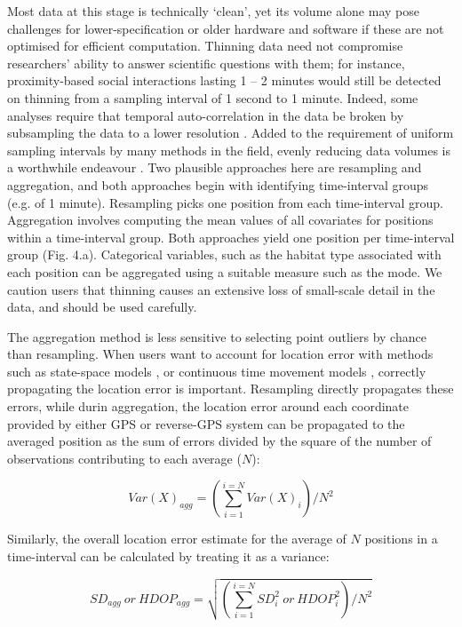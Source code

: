 \documentclass[10pt,paper=a4,headings=standardclasses
]{scrartcl}
\begin{document}
Most data at this stage is technically ‘clean’, yet its volume alone may pose challenges for lower-specification or older hardware and software if these are not optimised for efficient computation.
Thinning data need not compromise researchers' ability to answer scientific questions with them; for instance, proximity-based social interactions lasting 1 -- 2 minutes would still be detected on thinning from a sampling interval of 1 second to 1 minute.
Indeed, some analyses require that temporal auto-correlation in the data be broken by subsampling the data to a lower resolution \citep[such as the estimation of home-ranges or step-selection functions][]{fleming2014a, dupke2017}.
Added to the requirement of uniform sampling intervals by many methods in the field, evenly reducing data volumes is a worthwhile endeavour \citep[e.g.][]{fleming2014a, michelot2016, avgar2016}.
Two plausible approaches here are resampling and aggregation, and both approaches begin with identifying time-interval groups (e.g. of 1 minute).
Resampling picks one position from each time-interval group.
Aggregation involves computing the mean values of all covariates for positions within a time-interval group.
Both approaches yield one position per time-interval group (Fig. 4.a).
Categorical variables, such as the habitat type associated with each position can be aggregated using a suitable measure such as the mode.
We caution users that thinning causes an extensive loss of small-scale detail in the data, and should be used carefully.

The aggregation method is less sensitive to selecting point outliers by chance than resampling.
When users want to account for location error with methods such as state-space models \citep{jonsen2003, jonsen2005, johnson2008}, or continuous time movement models \citep{fleming2014a, noonan2019, gurarie2017, calabrese2016, fleming2020}, correctly propagating the location error is important.
Resampling directly propagates these errors, while durin aggregation,
the location error around each coordinate provided by either GPS or reverse-GPS system can be propagated to the averaged position as the sum of errors divided by the square of the number of observations contributing to each average ($N$):
\begin{linenomath*}
    \begin{equation*}
        Var(X)_{agg} = \left( \sum_{i=1}^{i=N} Var(X)_i \right) / N ^ 2
    \end{equation*}
\end{linenomath*}
Similarly, the overall location error estimate for the average of $N$ positions in a time-interval can be calculated by treating it as a variance:
\begin{linenomath*}
    \begin{equation*}
        SD_{agg} \ or \ HDOP_{agg} = \sqrt{ \left( \sum_{i=1}^{i=N} SD_i^2 \ or \ HDOP_i^2 \right) / N ^ 2  }
    \end{equation*}    
\end{linenomath*}
\end{document}
